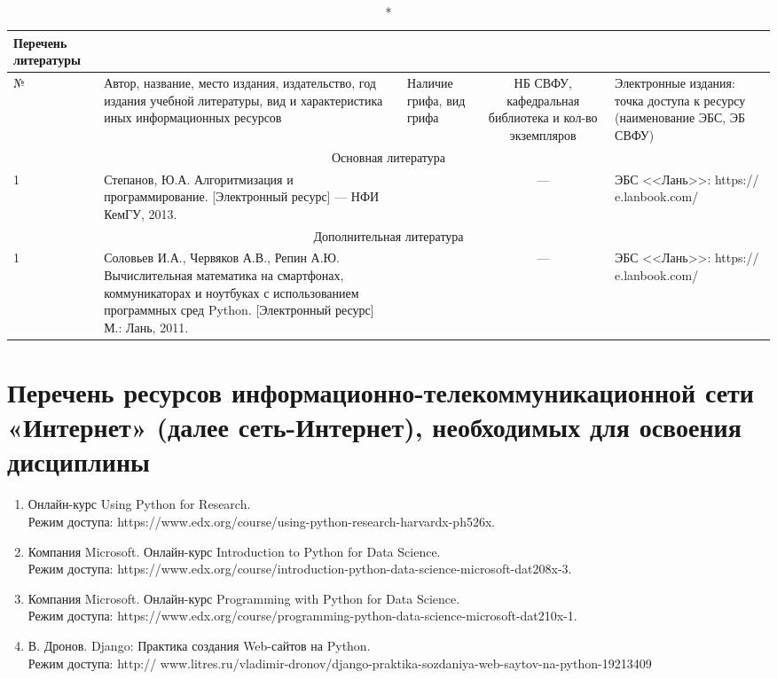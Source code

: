 \documentclass[a4paper,12pt]{article}
\begin{document}
  \begin{longtable}{|l|p{7cm}|p{18mm}|c|p{32mm}|}
  \caption*{Перечень литературы}\\
  \hline
  № & 
  \centering\small\arraybackslash Автор, название, место издания, издательство, год издания учебной литературы, вид и характеристика иных информационных ресурсов &
  \multicolumn{1}{p{18mm}|}{\centering\small\arraybackslash Наличие грифа, вид грифа} &
  \multicolumn{1}{p{21mm}|}{\centering\small\arraybackslash НБ СВФУ, кафедральная библиотека и кол-во экземпляров} & 
  \centering\small\arraybackslash Электронные издания: точка доступа к ресурсу (наименование ЭБС, ЭБ СВФУ)\\
  \hline
  \multicolumn{5}{|c|}{Основная литература}\\
  \hline
  1 &\raggedright\arraybackslash Степанов, Ю.А. Алгоритмизация и программирование. [Электронный ресурс] — НФИ КемГУ, 2013.  &    &  ---  & ЭБС <<Лань>>: https:// e.lanbook.com/ 
  \\
  \hline
  
  \multicolumn{5}{|c|}{Дополнительная литература}\\
  \hline
  1 &\raggedright\arraybackslash Соловьев И.А., Червяков А.В., Репин А.Ю. Вычислительная математика на смартфонах, коммуникаторах и ноутбуках с использованием программных сред Python. [Электронный ресурс]  М.: Лань, 2011.  &    &  ---  & ЭБС <<Лань>>: https:// e.lanbook.com/ 
  \\
  \hline
  
  \end{longtable}
  
\section{Перечень ресурсов информационно-телекоммуникационной сети «Интернет» (далее сеть-Интернет), необходимых для освоения дисциплины}
\begin{enumerate}
  
  \item Онлайн-курс Using Python for Research. \\ Режим доступа: https://www.edx.org/course/using-python-research-harvardx-ph526x. 
  
  \item Компания Microsoft. Онлайн-курс Introduction to Python for Data Science. \\ Режим доступа: https://www.edx.org/course/introduction-python-data-science-microsoft-dat208x-3. 
  
  \item Компания Microsoft. Онлайн-курс Programming with Python for Data Science. \\ Режим доступа: https://www.edx.org/course/programming-python-data-science-microsoft-dat210x-1. 
  
  \item В. Дронов. Django: Практика создания Web-сайтов на Python. \\ Режим доступа: http:// www.litres.ru/vladimir-dronov/django-praktika-sozdaniya-web-saytov-na-python-19213409 
  
\end{enumerate}
\end{document}
